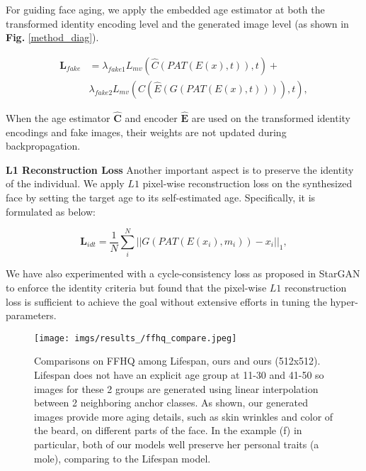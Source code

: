 \documentclass[final]{cvpr}
\begin{document}
For guiding face aging, we apply the embedded age estimator at both the transformed identity encoding level and the generated image level (as shown in \textbf{Fig.} \ref{method_diag}).

\begin{equation}
\begin{split}
\mathbf{L}_{fake} &= \lambda_{fake1} L_{mv}(\hat{C}(PAT(E(x), t)), t) + \\
                                    & \lambda_{fake2} L_{mv}(\hat{C}(\hat{E}(G(PAT(E(x), t)))), t),
\label{fake_age_loss}
\end{split}
\end{equation}

When the age estimator \(\mathbf{\hat{C}}\) and encoder \(\mathbf{\hat{E}}\) are used on the transformed identity encodings and fake images, their weights are not updated during backpropagation.

\textbf{L1 Reconstruction Loss}
Another important aspect is to preserve the identity of the individual. We apply \(L1\) pixel-wise reconstruction loss on the synthesized face by setting the target age to its self-estimated age. Specifically, it is formulated as below:

\begin{equation}
\mathbf{L}_{idt} = \frac{1}{N} \sum_{i}^{N} || G(PAT(E(x_i), m_i)) - x_i ||_1,
\label{idt_loss}
\end{equation}

We have also experimented with a cycle-consistency loss as proposed in StarGAN \cite{choi2018stargan} to enforce the identity criteria but found that the pixel-wise \(L1\) reconstruction loss is sufficient to achieve the goal without extensive efforts in tuning the hyper-parameters.


\begin{figure*}[t!]
    
    \texttt{[image: imgs/results\_/ffhq\_compare.jpeg]}  
    

    \caption{Comparisons on FFHQ \cite{karras2019style} among Lifespan\cite{orel2020lifespan}, ours and ours (512x512). Lifespan does not have an explicit age group at 11-30 and 41-50 so images for these 2 groups are generated using linear interpolation between 2 neighboring anchor classes. As shown, our generated images provide more aging details, such as skin wrinkles and color of the beard, on different parts of the face. In the example (f) in particular, both of our models well preserve her personal traits (a mole), comparing to the Lifespan model.}
    \label{ffhq_img}
\end{figure*}
\end{document}
